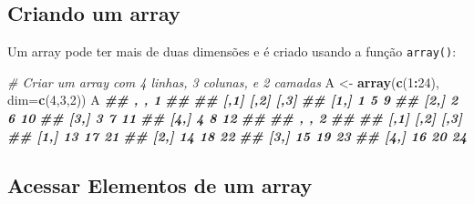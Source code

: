 \documentclass[
]{book}
\newenvironment{Shaded}{\begin{snugshade}}{\end{snugshade}}
\newcommand{\AttributeTok}[1]{\textcolor[rgb]{0.13,0.29,0.53}{#1}}
\newcommand{\CommentTok}[1]{\textcolor[rgb]{0.56,0.35,0.01}{\textit{#1}}}
\newcommand{\DecValTok}[1]{\textcolor[rgb]{0.00,0.00,0.81}{#1}}
\newcommand{\DocumentationTok}[1]{\textcolor[rgb]{0.56,0.35,0.01}{\textbf{\textit{#1}}}}
\newcommand{\FunctionTok}[1]{\textcolor[rgb]{0.13,0.29,0.53}{\textbf{#1}}}
\newcommand{\NormalTok}[1]{#1}
\newcommand{\OtherTok}[1]{\textcolor[rgb]{0.56,0.35,0.01}{#1}}
\newcommand{\SpecialCharTok}[1]{\textcolor[rgb]{0.81,0.36,0.00}{\textbf{#1}}}
\begin{document}
\subsection{Criando um array}\label{criando-um-array}

Um array pode ter mais de duas dimensões e é criado usando a função
\texttt{array()}:

\begin{Shaded}
\begin{Highlighting}[]
\CommentTok{\# Criar um array com 4 linhas, 3 colunas, e 2 camadas}
\NormalTok{A }\OtherTok{\textless{}{-}} \FunctionTok{array}\NormalTok{(}\FunctionTok{c}\NormalTok{(}\DecValTok{1}\SpecialCharTok{:}\DecValTok{24}\NormalTok{), }\AttributeTok{dim=}\FunctionTok{c}\NormalTok{(}\DecValTok{4}\NormalTok{,}\DecValTok{3}\NormalTok{,}\DecValTok{2}\NormalTok{))}
\NormalTok{A}
\DocumentationTok{\#\# , , 1}
\DocumentationTok{\#\# }
\DocumentationTok{\#\#      [,1] [,2] [,3]}
\DocumentationTok{\#\# [1,]    1    5    9}
\DocumentationTok{\#\# [2,]    2    6   10}
\DocumentationTok{\#\# [3,]    3    7   11}
\DocumentationTok{\#\# [4,]    4    8   12}
\DocumentationTok{\#\# }
\DocumentationTok{\#\# , , 2}
\DocumentationTok{\#\# }
\DocumentationTok{\#\#      [,1] [,2] [,3]}
\DocumentationTok{\#\# [1,]   13   17   21}
\DocumentationTok{\#\# [2,]   14   18   22}
\DocumentationTok{\#\# [3,]   15   19   23}
\DocumentationTok{\#\# [4,]   16   20   24}
\end{Highlighting}
\end{Shaded}

\subsection{Acessar Elementos de um array}\label{acessar-elementos-de-um-array}
\end{document}
